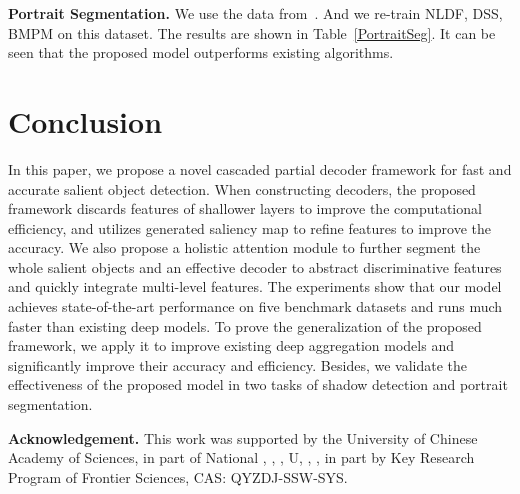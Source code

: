 \documentclass[10pt,twocolumn,letterpaper]{article}
\begin{document}
\begin{table}[t]
  \centering
  \caption{\emph{Quantitative Comparison on Portrait Segmentation.}}
  \label{PortraitSeg}
\end{table}

\noindent \textbf{Portrait Segmentation.} We use the data from~\cite{2016PortraiSeg}. And we re-train NLDF, DSS, BMPM on this dataset. The results are shown in Table~\ref{PortraitSeg}. It can be seen that the proposed model outperforms existing algorithms.

\section{Conclusion}
In this paper, we propose a novel cascaded partial decoder framework for fast and accurate salient object detection. When constructing decoders, the proposed framework discards features of shallower layers to improve the computational efficiency, and utilizes generated saliency map to refine features to improve the accuracy. We also propose a holistic attention module to further segment the whole salient objects and an effective decoder to abstract discriminative features and quickly integrate multi-level features. The experiments show that our model achieves state-of-the-art performance on five benchmark datasets and runs much faster than existing deep models. To prove the generalization of the proposed framework, we apply it to improve existing deep aggregation models and significantly improve their accuracy and efficiency. Besides, we validate the effectiveness of the proposed model in two tasks of shadow detection and portrait segmentation.

\noindent \textbf{Acknowledgement.} This work was supported by the University of Chinese Academy of Sciences, in part of National , , , U, , , in part by Key Research Program of Frontier Sciences, CAS: QYZDJ-SSW-SYS.

{\small


}
\end{document}
